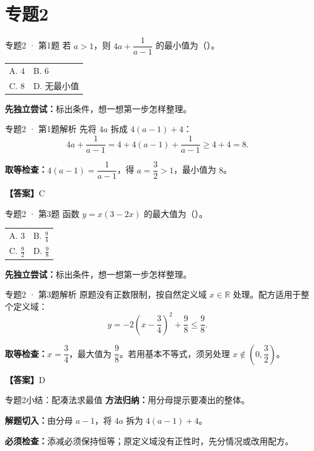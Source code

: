 \documentclass[UTF8,10pt,aspectratio=169]{ctexbeamer}
\makeatletter
\newcommand{\Answer}[1]{\par\vspace{0.2cm}\textbf{【答案】}#1}
\newcommand{\Choices}[4]{\par\vspace{0.2cm}\begin{tabular}{@{}p{0.47\textwidth}p{0.47\textwidth}@{}}A. #1 & B. #2 \\[0.15cm] C. #3 & D. #4\end{tabular}}
\makeatother
\begin{document}
\section{专题2}
\begin{frame}[t]{专题2 · 第1题}
若 $a>1$，则 $4a+\dfrac1{a-1}$ 的最小值为（\quad）。
\Choices{$4$}{$6$}{$8$}{$\text{无最小值}$}
\par\vspace{0.3cm}\textbf{先独立尝试：}标出条件，想一想第一步怎样整理。
\end{frame}
\begin{frame}[t]{专题2 · 第1题解析}
先将 $4a$ 拆成 $4(a-1)+4$：\[4a+\frac1{a-1}=4+4(a-1)+\frac1{a-1}\ge4+4=8.\]
\pause
\par\vspace{0.2cm}\textbf{取等检查：}$4(a-1)=\dfrac{1}{a-1}$，得 $a=\dfrac{3}{2}>1$，最小值为 $8$。
\Answer{C}
\end{frame}
\begin{frame}[t]{专题2 · 第3题}
函数 $y=x(3-2x)$ 的最大值为（\quad）。
\Choices{$3$}{$\frac94$}{$\frac92$}{$\frac98$}
\par\vspace{0.3cm}\textbf{先独立尝试：}标出条件，想一想第一步怎样整理。
\end{frame}
\begin{frame}[t]{专题2 · 第3题解析}
原题没有正数限制，按自然定义域 $x\in\mathbb R$ 处理。配方适用于整个定义域：\[y=-2\left(x-\frac34\right)^2+\frac98\le\frac98.\]
\pause
\par\vspace{0.2cm}\textbf{取等检查：}$x=\dfrac{3}{4}$，最大值为 $\dfrac{9}{8}$。若用基本不等式，须另处理 $x\notin(0,\dfrac{3}{2})$。
\Answer{D}
\end{frame}
\begin{frame}[t]{专题2小结：配凑法求最值}
\textbf{方法归纳：}用分母提示要凑出的整体。\par\vspace{0.4cm}
\textbf{解题切入：}由分母 $a-1$，将 $4a$ 拆为 $4(a-1)+4$。\par\vspace{0.4cm}
\textbf{必须检查：}添减必须保持恒等；原定义域没有正性时，先分情况或改用配方。
\end{frame}
\end{document}
